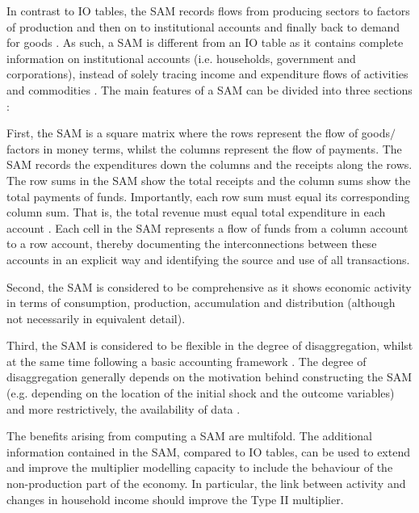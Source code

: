 \bigskip

In contrast to IO tables, the SAM records flows from producing sectors to factors of production and then on to institutional accounts and finally back to demand for goods \cite{Adelman1986a}. As such, a SAM is different from an IO table as it contains complete information on institutional accounts (i.e. households, government and corporations), instead of solely tracing income and expenditure flows of activities and commodities . The main features of a SAM can be divided into three sections \cite{Round2003a}:  

\bigskip

First, the SAM is a square matrix where the rows represent the flow of goods$/$factors in money terms, whilst the columns represent the flow of payments. The SAM records the expenditures down the columns and the receipts along the rows. The row sums in the SAM show the total receipts and the column sums show the total payments of funds. Importantly, each row sum must equal its corresponding column sum. That is, the total revenue must equal total expenditure in each account . Each cell in the SAM represents a flow of funds from a column account to a row account, thereby documenting the interconnections between these accounts in an explicit way and identifying the source and use of all transactions.

\bigskip

Second, the SAM is considered to be comprehensive as it shows economic activity in terms of consumption, production, accumulation and distribution (although not necessarily in equivalent detail).

\bigskip

Third, the SAM is considered to be flexible in the degree of disaggregation, whilst at the same time following a basic accounting framework . The degree of disaggregation generally depends on the motivation behind constructing the SAM (e.g. depending on the location of the initial shock and the outcome variables) and more restrictively, the availability of data \cite{Round2003a}.

\bigskip

The benefits arising from computing a SAM are multifold. The additional information contained in the SAM, compared to IO tables, can be used to extend and improve the multiplier modelling capacity to include the behaviour of the non-production part of the economy. In particular, the link between activity and changes in household income should improve the Type II multiplier.

